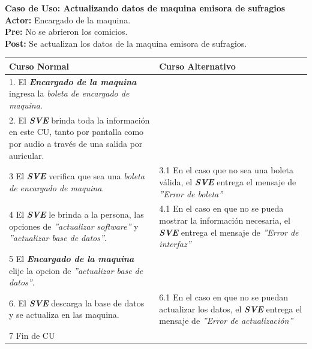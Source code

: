 \documentclass[spanish, 10pt,a4paper]{article}
\numberwithin{equation}{section} %
\begin{document}
\noindent\textbf{Caso de Uso: Actualizando datos de maquina emisora de sufragios}\\
\textbf{Actor: } Encargado de la maquina.\\
\textbf{Pre: } No se abrieron los comicios.\\
\textbf{Post: } Se actualizan los datos de la maquina emisora de sufragios.\\
\begin{table}[H]
  \centering
\bgroup
\def\arraystretch{1.3}
  \begin{tabular}{p{9cm} | p{7cm}}
    \hline
    Curso Normal & Curso Alternativo \\
    \hline
    \hline    
    1. El \textbf{\textit{Encargado de la maquina}} ingresa la \textit{boleta de encargado de maquina}. 
    & \\
    
    \hline
    2. El \textbf{\textit{SVE}} brinda toda la información en este CU, tanto por pantalla como por audio a través de una salida por auricular.
    &
    \\
    
    \hline
    3 El \textbf{\textit{SVE}} verifica que sea una \textit{boleta de encargado de maquina}.
    & 
    3.1 En el caso que no sea una boleta válida, el \textbf{\textit{SVE}} entrega el mensaje de \textit{''Error de boleta''}
    \\
    
    \hline
    4 El \textbf{\textit{SVE}} le brinda a la persona, las opciones de \textit{''actualizar software''} y \textit{''actualizar base de datos''}.
    & 
    4.1 En el caso en que no se pueda mostrar la información necesaria, el \textbf{\textit{SVE}} entrega el mensaje de \textit{''Error de interfaz''}
    \\
    
    \hline
    5 El \textbf{\textit{Encargado de la maquina}} elije la opcion de \textit{''actualizar base de datos''}.
    & \\
    
    \hline
    6. El \textbf{\textit{SVE}} descarga la base de datos y se actualiza en las maquina.
    &
    6.1 En el caso en que no se puedan actualizar los datos, el \textbf{\textit{SVE}} entrega el mensaje de \textit{''Error de actualización''}
    \\
    
    \hline
    7 Fin de CU
    & \\
    \hline
  \end{tabular}
\egroup
\end{table}
\end{document}

